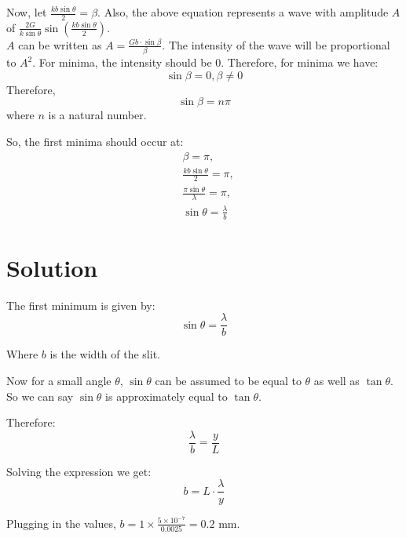 \documentclass[journal,12pt,twocolumn]{IEEEtran}
\theoremstyle{remark}
\begin{document}
Now, let $\frac{k b\sin\theta}{2} = \beta$. Also, the above equation represents a wave with amplitude $A$ of $\frac{2G}{k\sin\theta}\sin\left(\frac{k b \sin\theta}{2}\right)$.\\


$A$ can be written as $A = \frac{Gb\cdot\sin\beta}{\beta}$.
The intensity of the wave will be proportional to $A^2$. For minima, the intensity should be $0$. Therefore, for minima we have:
$$
\sin\beta = 0,  \beta \neq 0
$$
Therefore, $$
\sin\beta = n\pi
$$
where \(n\) is a natural number.

So, the first minima should occur at:
\begin{align*}
&\beta = \pi,\\
&\frac{kb\sin\theta}{2} = \pi,\\
&\frac{\pi\sin\theta}{\lambda} = \pi,\\
&\sin\theta = \frac{\lambda}{b}
\end{align*}

\section{Solution}

The first minimum is given by:
\[
\sin\theta = \frac{\lambda}{b}
\]

Where \(b\) is the width of the slit.

Now for a small angle \(\theta\), \(\sin\theta\) can be assumed to be equal to \(\theta\) as well as \(\tan\theta\). So we can say \(\sin\theta\) is approximately equal to \(\tan\theta\).

Therefore:
\[
\frac{\lambda}{b} = \frac{y}{L}
\]

Solving the expression we get:
\[
b = L \cdot \frac{\lambda}{y}
\]

Plugging in the values, \(b = 1 \times \frac{5 \times 10^{-7}}{0.0025} = 0.2\) mm.
\end{document}

